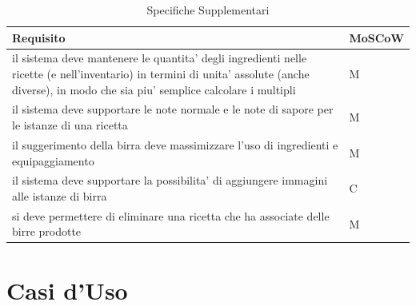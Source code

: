 \documentclass[a4paper,12pt]{report}
\begin{document}
    		\begin{table}[!h]
      			\renewcommand{\arraystretch}{1.2}
      			\begin{tabular}{p{}|p{}} 
        				\textbf{Requisito}  & \textbf{MoSCoW} \\
    				\hline
                                  il sistema deve mantenere le quantita' degli ingredienti nelle ricette (e nell'inventario) in termini di unita' assolute (anche diverse), in modo che sia piu' semplice calcolare i multipli & M \\
                                  il sistema deve supportare le note normale e le note di sapore per le istanze di una ricetta  & M \\
                                  il suggerimento della birra deve massimizzare l'uso di ingredienti e equipaggiamento & M \\
                                  il sistema deve supportare la possibilita' di aggiungere immagini alle istanze di birra & C \\
                                  si deve permettere di eliminare una ricetta che ha associate delle birre prodotte & M \\
        			\end{tabular}
        			\caption{Specifiche Supplementari}
      			\label{tab:Specifiche Supplementari}
    		\end{table}	
	
	
    \newpage
	\section{Casi d'Uso}
	
\end{document}
